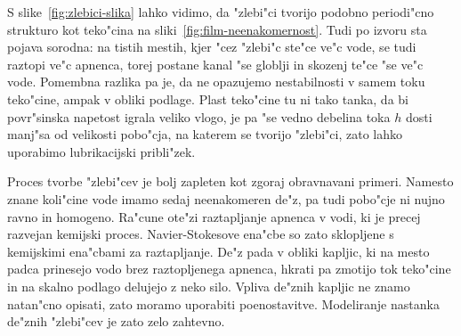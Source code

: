 \documentclass[a4paper,12pt]{article}
\begin{document}
S slike~\ref{fig:zlebici-slika} lahko vidimo, da "zlebi"ci tvorijo podobno periodi"cno strukturo kot teko"cina na sliki~\ref{fig:film-neenakomernost}. Tudi po izvoru sta pojava sorodna: na tistih mestih, kjer "cez "zlebi"c ste"ce ve"c vode, se tudi raztopi ve"c apnenca, torej postane kanal "se globlji in skozenj te"ce "se ve"c vode. Pomembna razlika pa je, da ne opazujemo nestabilnosti v samem toku teko"cine, ampak v obliki podlage. Plast teko"cine tu ni tako tanka, da bi povr"sinska napetost igrala veliko vlogo, je pa "se vedno debelina toka $h$ dosti manj"sa od velikosti pobo"cja, na katerem se tvorijo "zlebi"ci, zato lahko uporabimo lubrikacijski pribli"zek.

Proces tvorbe "zlebi"cev je bolj zapleten kot zgoraj obravnavani primeri. Namesto znane koli"cine vode imamo sedaj neenakomeren de"z, pa tudi pobo"cje ni nujno ravno in homogeno. Ra"cune ote"zi raztapljanje apnenca v vodi, ki je precej razvejan kemijski proces. Navier-Stokesove ena"cbe so zato sklopljene s kemijskimi ena"cbami za raztapljanje. De"z pada v obliki kapljic, ki na mesto padca prinesejo vodo brez raztopljenega apnenca, hkrati pa zmotijo tok teko"cine in na skalno podlago delujejo z neko silo. Vpliva de"znih kapljic ne znamo natan"cno opisati, zato moramo uporabiti poenostavitve. Modeliranje nastanka de"znih "zlebi"cev je zato zelo zahtevno. 
\end{document}
